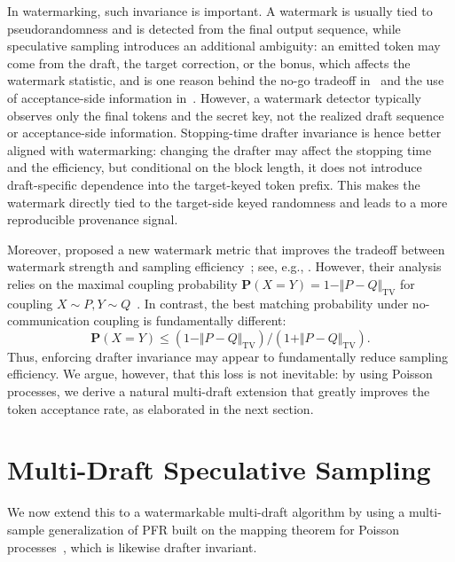 \documentclass{article}
\theoremstyle{plain}
\theoremstyle{definition}
\begin{document}
In watermarking, such invariance is important. 
A watermark is usually tied to pseudorandomness and is detected from the final output sequence, while speculative sampling introduces an additional ambiguity: an emitted token may come from the draft, the target correction, or the bonus, which affects the watermark statistic, and is one reason behind the no-go tradeoff in~\citep{hu2024inevitable} and the use of acceptance-side information in~\citep{he2026improving}. 
However, a watermark detector typically observes only the final tokens and the secret key, not the realized draft sequence or acceptance-side information. 
Stopping-time drafter invariance is hence better aligned with watermarking: changing the drafter may affect the stopping time and the efficiency, but conditional on the block length, it does not introduce draft-specific dependence into the target-keyed token prefix. 
This makes the watermark directly tied to the target-side keyed randomness and leads to a more reproducible provenance signal. 


{\color{teal}
Moreover, \citep{he2026improving} proposed a new watermark metric that improves the tradeoff between watermark strength and sampling efficiency~\citep{hu2024inevitable}; see, e.g., \citep[Figure~1]{he2026improving}. 
However, their analysis relies on the maximal coupling probability $\mathbf{P}(X=Y)=1-\Vert P-Q\Vert_{\mathrm{TV}}$ for coupling $X\sim P, Y\sim Q$~\citep{thorisson2000coupling, den2012probability}. 
In contrast, the best matching probability under no-communication coupling is fundamentally different:
\begin{equation}
    \mathbf{P}(X = Y) \leq (1 - \Vert P - Q\Vert_{\mathrm{TV}}) / (1 + \Vert P - Q\Vert_{\mathrm{TV}}).
    \label{eq::cpl_wo_commu_bd}
\end{equation}
Thus, enforcing drafter invariance may appear to fundamentally reduce sampling efficiency. 
We argue, however, that this loss is not inevitable: by using Poisson processes, we derive a natural multi-draft extension that greatly improves the token acceptance rate, as elaborated in the next section.
}



\section{Multi-Draft Speculative Sampling}
\label{sec::multi_draft}


We now extend this to a watermarkable multi-draft algorithm by using a multi-sample generalization of PFR built on the mapping theorem for Poisson processes~\citep{li2021unified, last2017lectures}, which is likewise drafter invariant. 
\end{document}
